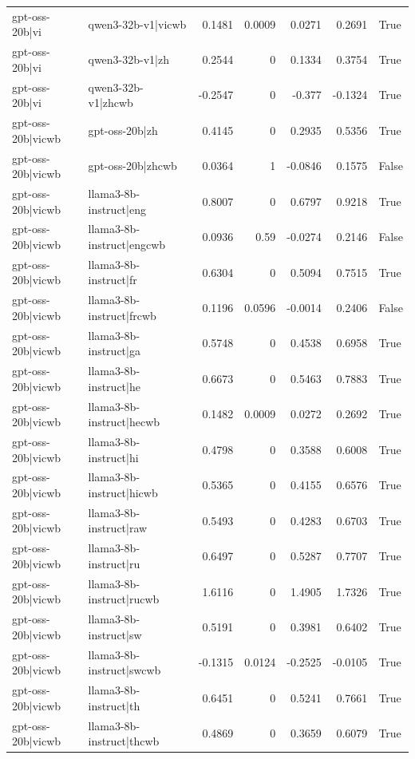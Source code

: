 \begin{table}
\begin{tabular}{l l r r r r l}
gpt-oss-20b|vi & qwen3-32b-v1|vicwb & 0.1481 & 0.0009 & 0.0271 & 0.2691 & True \\
gpt-oss-20b|vi & qwen3-32b-v1|zh & 0.2544 & 0 & 0.1334 & 0.3754 & True \\
gpt-oss-20b|vi & qwen3-32b-v1|zhcwb & -0.2547 & 0 & -0.377 & -0.1324 & True \\
gpt-oss-20b|vicwb & gpt-oss-20b|zh & 0.4145 & 0 & 0.2935 & 0.5356 & True \\
gpt-oss-20b|vicwb & gpt-oss-20b|zhcwb & 0.0364 & 1 & -0.0846 & 0.1575 & False \\
gpt-oss-20b|vicwb & llama3-8b-instruct|eng & 0.8007 & 0 & 0.6797 & 0.9218 & True \\
gpt-oss-20b|vicwb & llama3-8b-instruct|engcwb & 0.0936 & 0.59 & -0.0274 & 0.2146 & False \\
gpt-oss-20b|vicwb & llama3-8b-instruct|fr & 0.6304 & 0 & 0.5094 & 0.7515 & True \\
gpt-oss-20b|vicwb & llama3-8b-instruct|frcwb & 0.1196 & 0.0596 & -0.0014 & 0.2406 & False \\
gpt-oss-20b|vicwb & llama3-8b-instruct|ga & 0.5748 & 0 & 0.4538 & 0.6958 & True \\
gpt-oss-20b|vicwb & llama3-8b-instruct|he & 0.6673 & 0 & 0.5463 & 0.7883 & True \\
gpt-oss-20b|vicwb & llama3-8b-instruct|hecwb & 0.1482 & 0.0009 & 0.0272 & 0.2692 & True \\
gpt-oss-20b|vicwb & llama3-8b-instruct|hi & 0.4798 & 0 & 0.3588 & 0.6008 & True \\
gpt-oss-20b|vicwb & llama3-8b-instruct|hicwb & 0.5365 & 0 & 0.4155 & 0.6576 & True \\
gpt-oss-20b|vicwb & llama3-8b-instruct|raw & 0.5493 & 0 & 0.4283 & 0.6703 & True \\
gpt-oss-20b|vicwb & llama3-8b-instruct|ru & 0.6497 & 0 & 0.5287 & 0.7707 & True \\
gpt-oss-20b|vicwb & llama3-8b-instruct|rucwb & 1.6116 & 0 & 1.4905 & 1.7326 & True \\
gpt-oss-20b|vicwb & llama3-8b-instruct|sw & 0.5191 & 0 & 0.3981 & 0.6402 & True \\
gpt-oss-20b|vicwb & llama3-8b-instruct|swcwb & -0.1315 & 0.0124 & -0.2525 & -0.0105 & True \\
gpt-oss-20b|vicwb & llama3-8b-instruct|th & 0.6451 & 0 & 0.5241 & 0.7661 & True \\
gpt-oss-20b|vicwb & llama3-8b-instruct|thcwb & 0.4869 & 0 & 0.3659 & 0.6079 & True \\

\end{tabular}
\end{table}

